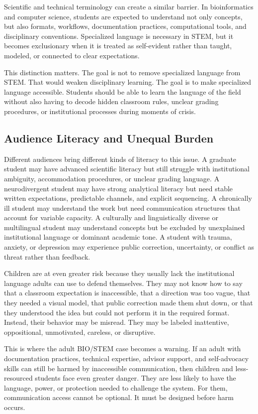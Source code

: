 \documentclass[12pt]{article}
\begin{document}
Scientific and technical terminology can create a similar barrier. In bioinformatics and computer science, students are expected to understand not only concepts, but also formats, workflows, documentation practices, computational tools, and disciplinary conventions. Specialized language is necessary in STEM, but it becomes exclusionary when it is treated as self-evident rather than taught, modeled, or connected to clear expectations.

This distinction matters. The goal is not to remove specialized language from STEM. That would weaken disciplinary learning. The goal is to make specialized language accessible. Students should be able to learn the language of the field without also having to decode hidden classroom rules, unclear grading procedures, or institutional processes during moments of crisis.

\subsection*{Audience Literacy and Unequal Burden}

Different audiences bring different kinds of literacy to this issue. A graduate student may have advanced scientific literacy but still struggle with institutional ambiguity, accommodation procedures, or unclear grading language. A neurodivergent student may have strong analytical literacy but need stable written expectations, predictable channels, and explicit sequencing. A chronically ill student may understand the work but need communication structures that account for variable capacity. A culturally and linguistically diverse or multilingual student may understand concepts but be excluded by unexplained institutional language or dominant academic tone. A student with trauma, anxiety, or depression may experience public correction, uncertainty, or conflict as threat rather than feedback.

Children are at even greater risk because they usually lack the institutional language adults can use to defend themselves. They may not know how to say that a classroom expectation is inaccessible, that a direction was too vague, that they needed a visual model, that public correction made them shut down, or that they understood the idea but could not perform it in the required format. Instead, their behavior may be misread. They may be labeled inattentive, oppositional, unmotivated, careless, or disruptive.

This is where the adult BIO/STEM case becomes a warning. If an adult with documentation practices, technical expertise, advisor support, and self-advocacy skills can still be harmed by inaccessible communication, then children and less-resourced students face even greater danger. They are less likely to have the language, power, or protection needed to challenge the system. For them, communication access cannot be optional. It must be designed before harm occurs.
\end{document}
